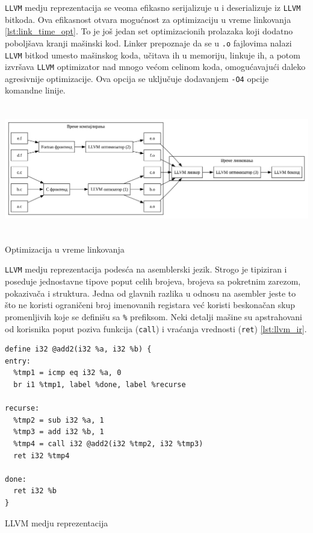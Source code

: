 \verb|LLVM| medju reprezentacija se veoma efikasno serijalizuje u i deserializuje iz \verb|LLVM| bitkoda. 
Ova efikasnost otvara mogućnost za optimizaciju u vreme linkovanja \ref{lst:link_time_opt}. To je još jedan set optimizacionih prolazaka 
koji dodatno poboljšava kranji mašinski kod. Linker prepoznaje da se u \verb|.o| fajlovima nalazi 
\verb|LLVM| bitkod umesto mašinskog koda, učitava ih u memoriju, linkuje ih, a potom izvršava \verb|LLVM|
optimizator nad mnogo većom celinom koda, omogućavajući daleko agresivnije optimizacije. 
Ova opcija se uključuje dodavanjem \verb|-O4| opcije komandne linije. 

\begin{listing}[H]
\begin{center}
\includegraphics[width=6in, height=2.2in]{assets/images/link_time_optimization.png}
\end{center}
\caption{Optimizacija u vreme linkovanja}
\label{lst:link_time_opt}
\end{listing}

\verb|LLVM| medju reprezentacija podesća na asemblerski jezik. Strogo je tipiziran i poseduje jednostavne 
tipove poput celih brojeva, brojeva sa pokretnim zarezom, pokazivača i struktura. Jedna od glavnih razlika 
u odnosu na asembler jeste to što ne koristi ograničeni broj imenovanih registara već koristi beskonačan 
skup promenljivih koje se definišu sa \verb|%| prefiksom. Neki detalji mašine su apstrahovani od korisnika 
poput poziva funkcija (\verb|call|) i vraćanja vrednosti (\verb|ret|) \ref{lst:llvm_ir}.

\begin{listing}[H]
\begin{verbatim}
define i32 @add2(i32 %a, i32 %b) {
entry:
  %tmp1 = icmp eq i32 %a, 0
  br i1 %tmp1, label %done, label %recurse

recurse:
  %tmp2 = sub i32 %a, 1
  %tmp3 = add i32 %b, 1
  %tmp4 = call i32 @add2(i32 %tmp2, i32 %tmp3)
  ret i32 %tmp4

done:
  ret i32 %b
}
\end{verbatim}
\caption{LLVM medju reprezentacija}
\label{lst:llvm_ir}
\end{listing}


